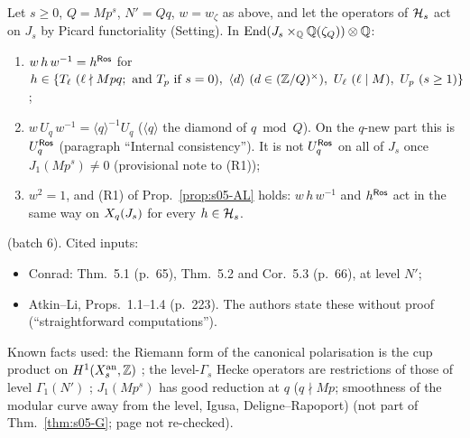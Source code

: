 \begin{lemma}\label{lem:s05-R1}
Let $s\ge0$, $Q=Mp^s$, $N'=Qq$, $w=w_\zeta$ as above, and let the operators of $\mathcal{H}_s$ act on $J_s$ by Picard functoriality (Setting). In
$\operatorname{End}(J_s\times_{\mathbb{Q}}\mathbb{Q}(\zeta_Q))\otimes\mathbb{Q}$:
\begin{enumerate}[label=(\alph*)]
\item $w\,h\,w^{-1}=h^{\mathsf{Ros}}$ for $h\in\{T_\ell\ (\ell\nmid Mpq;\ \text{and }T_p\text{ if }s=0),\ \langle d\rangle\ (d\in(\mathbb{Z}/Q)^\times),\ U_\ell\ (\ell\mid M),\ U_p\ (s\ge1)\}$;
\item $w\,U_q\,w^{-1}=\langle q\rangle^{-1}U_q$ ($\langle q\rangle$ the diamond of $q\bmod Q$). On the $q$-new part this is $U_q^{\mathsf{Ros}}$ (paragraph ``Internal consistency'').
  It is not $U_q^{\mathsf{Ros}}$ on all of $J_s$ once $J_1(Mp^s)\ne0$ (provisional note to (R1));
\item $w^2=1$, and (R1) of Prop.~\ref{prop:s05-AL} holds: $w\,h\,w^{-1}$ and $h^{\mathsf{Ros}}$ act in the same way on $X_q(J_s)$ for every $h\in\mathcal{H}_s$.
\end{enumerate}
\stpmc{} (batch 6). Cited inputs:
\begin{itemize}
\item Conrad: Thm.~5.1 (p.~65), Thm.~5.2 and Cor.~5.3 (p.~66), at level $N'$;
\item Atkin--Li, Props.~1.1--1.4 (p.~223). The authors state these without proof (``straightforward computations'').
\end{itemize}
Known facts used: the Riemann form of the canonical polarisation is the cup product on $H^1(X_s^{\rm an},\mathbb{Z})$ \stknown; the level-$\Gamma_s$
Hecke operators are restrictions of those of level $\Gamma_1(N')$ \stknown; $J_1(Mp^s)$ has good reduction at $q$ ($q\nmid Mp$; smoothness of the modular curve away from the level, Igusa, Deligne--Rapoport) \stknown{} (not part of Thm.~\ref{thm:s05-G}; page not re-checked).
\end{lemma}

